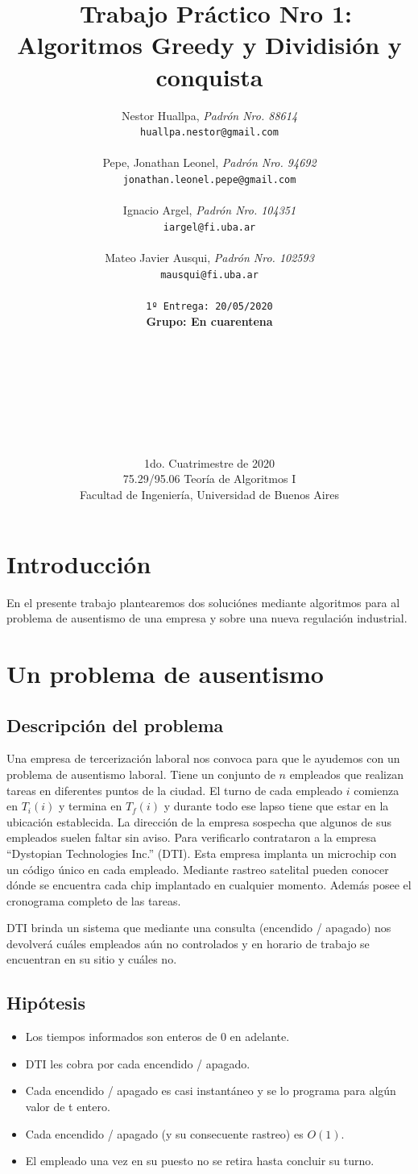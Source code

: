 \documentclass{article}
\title{	\ Trabajo Práctico Nro 1: Algoritmos Greedy y Dividisión y conquista}
\author{    Nestor Huallpa, \textit{Padrón Nro. 88614}\\
            \texttt{ huallpa.nestor@gmail.com }\\\\  
            Pepe, Jonathan Leonel, \textit{Padrón Nro. 94692}\\
            \texttt{ jonathan.leonel.pepe@gmail.com }\\\\     
            Ignacio Argel, \textit{Padrón Nro. 104351}\\
            \texttt{ iargel@fi.uba.ar }\\\\      
            Mateo Javier Ausqui, \textit{Padrón Nro. 102593}\\
            \texttt{ mausqui@fi.uba.ar }\\\\              
            \texttt{\footnotesize 1º Entrega: 20/05/2020}\\
            \textbf{Grupo: En cuarentena}
            \\\\\\\\\\\\\\\\\\
            \normalsize{1do. Cuatrimestre de 2020}\\ 
            \normalsize{75.29/95.06 Teoría de Algoritmos I} \\
            \normalsize{Facultad de Ingeniería, Universidad de Buenos Aires} \\}
\date{}
\begin{document}
\maketitle
\thispagestyle{empty}

\newpage{}
\tableofcontents

\thispagestyle{empty}

\newpage{}

\newpage
\section{Introducción}

En el presente trabajo plantearemos dos soluciónes mediante algoritmos para al problema de ausentismo de una empresa y sobre una nueva regulación industrial. 

\section{Un problema de ausentismo}

\subsection{Descripción del problema}

Una empresa de tercerización laboral nos convoca para que le ayudemos con un problema de ausentismo laboral. 
Tiene un conjunto de \(n\) empleados que realizan tareas en diferentes puntos de la ciudad. 
El turno de cada empleado \(i\) comienza en \(T_i(i)\) y termina en \(T_f(i)\) y durante todo ese lapso tiene que estar en la ubicación establecida. 
La dirección de la empresa sospecha que algunos de sus empleados suelen faltar sin aviso. Para verificarlo contrataron a la empresa “Dystopian Technologies Inc.” (DTI). 
Esta empresa implanta un microchip con un código único en cada empleado. Mediante rastreo satelital pueden conocer dónde se encuentra cada chip implantado en cualquier momento. Además posee el cronograma completo de las tareas.

DTI brinda un sistema que mediante una consulta (encendido / apagado) nos devolverá cuáles empleados aún no controlados y en horario de trabajo se encuentran en su sitio y cuáles no.
\subsection{Hipótesis}
\begin{itemize}
    \item Los tiempos informados son enteros de 0 en adelante.
    \item DTI les cobra por cada encendido / apagado.
    \item Cada encendido / apagado es casi instantáneo y se lo programa para algún valor de t entero.
    \item Cada encendido / apagado (y su consecuente rastreo) es \(O(1)\).
    \item El empleado una vez en su puesto no se retira hasta concluir su turno.
\end{itemize}
\end{document}
